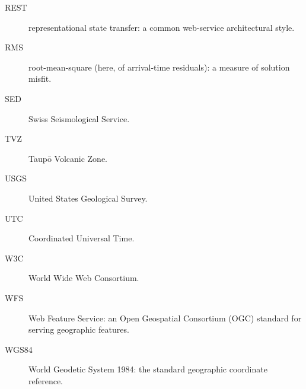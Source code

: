 \documentclass[11pt]{article}
\begin{document}
\begin{description}
\item[REST] representational state transfer: a common web-service architectural style.
\item[RMS] root-mean-square (here, of arrival-time residuals): a measure of solution misfit.
\item[SED] Swiss Seismological Service.
\item[TVZ] Taup\=o Volcanic Zone.
\item[USGS] United States Geological Survey.
\item[UTC] Coordinated Universal Time.
\item[W3C] World Wide Web Consortium.
\item[WFS] Web Feature Service: an Open Geospatial Consortium (OGC) standard for serving geographic features.
\item[WGS84] World Geodetic System 1984: the standard geographic coordinate reference.
\end{description}



\end{document}
